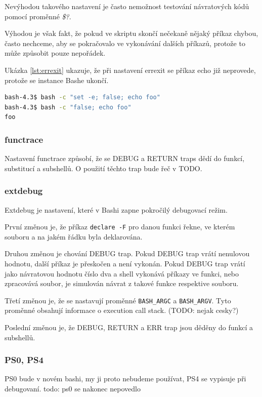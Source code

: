 \documentclass[thesis=M,czech]{FITthesis}[2012/06/26]
\begin{document}
Nevýhodou takového nastavení je často nemožnost testování návratových kódů pomocí proměnné \textit{\$?}.

Výhodou je však fakt, že pokud ve skriptu skončí nečekaně nějaký příkaz chybou, často nechceme, aby se pokračovalo ve vykonávání dalších příkazů, protože to může způsobit pouze nepořádek.

Ukázka \ref{lst:errexit} ukazuje, že při nastavení errexit se příkaz echo již neprovede, protože se instance Bashe ukončí.

\begin{lstlisting}[language=bash, caption={errexit}, label={lst:errexit}]
bash-4.3$ bash -c "set -e; false; echo foo"
bash-4.3$ bash -c "false; echo foo"
foo
\end{lstlisting}

%
%
%
\subsubsection{functrace}

Nastavení functrace způsobí, že se DEBUG a RETURN traps dědí do funkcí, substitucí a subshellů. O použití těchto trap bude řeč v TODO.


%
%
%
\subsubsection{extdebug}

Extdebug je nastavení, které v Bashi zapne pokročilý debugovací režim.

První změnou je, že příkaz \texttt{declare -F} pro danou funkci řekne, ve kterém souboru a na jakém řádku byla deklarována.

Druhou změnou je chování DEBUG trap. Pokud DEBUG trap vrátí nenulovou hodnotu, další příkaz je přeskočen a není vykonán. Pokud DEBUG trap vrátí jako návratovou hodnotu číslo dva a shell vykonává příkazy ve funkci, nebo zpracovává soubor, je simulován návrat z takové funkce respektive souboru.

Třetí změnou je, že se nastavují proměnné \texttt{BASH\_ARGC} a \texttt{BASH\_ARGV}. Tyto proměnné obsahují informace o execution call stack. (TODO: nejak cesky?)

Poslední změnou je, že DEBUG, RETURN a ERR trap jsou děděny do funkcí a subshellů.

%
\subsubsection{PS0, PS4}
PS0 bude v novém bashi, my ji proto nebudeme používat, PS4 se vypisuje při debugovaní.
todo: ps0 se nakonec nepovedlo
\end{document}

